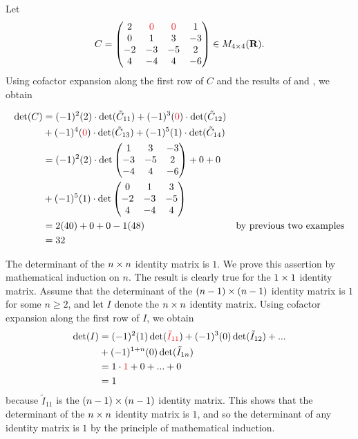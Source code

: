\begin{example} \label{example 4.2.3}
Let
\[
    C = \begin{pmatrix}
        2 & \RED{0} & \RED{0} & 1 \\
        0 & 1 & 3 & -3 \\
        -2 & -3 & -5 & 2 \\
        4 & -4 & 4 & -6
    \end{pmatrix} \in M_{4 \X 4}(\SET{R}).
\]
Using cofactor expansion along the first row of \(C\) and the results of  and , we obtain

\begin{align*}
    \det(C) & = (-1)^{2}(2) \cdot
                \det(\tilde{C}_{11}) + (-1)^{3}(\RED{0}) \cdot \det(\tilde{C}_{12}) \\
            & + (-1)^{4}(\RED{0}) \cdot
                \det(\tilde{C}_{13}) + (-1)^{5}(1) \cdot \det(\tilde{C}_{14}) \\
            & = (-1)^{2}(2) \cdot \det \begin{pmatrix}
                    1 & 3 & -3 \\
                    -3 & -5 & 2 \\
                    -4 & 4 & -6
                \end{pmatrix} + 0 + 0 \\
            & + (-1)^{5}(1) \cdot \det \begin{pmatrix}
                    0 & 1 & 3 \\
                    -2 & -3 & -5 \\
                    4 & -4 & 4
                \end{pmatrix} \\
            & = 2(40) + 0 + 0 - 1(48) & \text{by previous two examples} \\
            & = 32
\end{align*}
\end{example}

\begin{example} \label{example 4.2.4}
The determinant of the \(n \times n\) identity matrix is \(1\).
We prove this assertion by mathematical induction on \(n\).
The result is clearly true for the \(1 \times 1\) identity matrix.
Assume that the determinant of the \((n - 1) \times (n - 1)\) identity matrix is \(1\) for some \(n \ge 2\), and let \(I\) denote the \(n \times n\) identity matrix.
Using cofactor expansion along the first row of \(I\), we obtain
\begin{align*}
    \det(I) & = (-1)^2(1) \det (\RED{\tilde{I}_{11}}) + (-1)^3(0) \det (\tilde{I}_{12}) + ... \\
            & + (-1)^{1 + n} (0) \det(\tilde{I}_{1n}) \\
            & = 1 \cdot \RED{1} + 0 + ... + 0 \\
            & = 1
\end{align*}
because \(\tilde{I}_{11}\) is the \((n - 1) \times (n - 1)\) identity matrix.
This shows that the determinant of the \(n \times n\) identity matrix is \(1\), and so the determinant of any identity matrix is \(1\) by the principle of mathematical induction.
\end{example}

